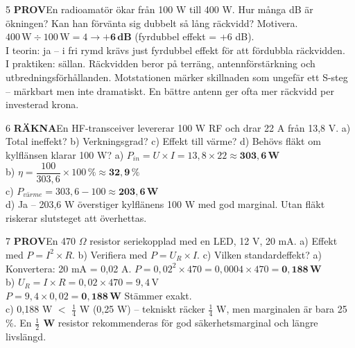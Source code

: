 \documentclass[a4paper,11pt,twoside]{book}
\newcommand{\qrakna}{\colorbox{bluepale}{\textcolor{bluedark}{\headingfont\bfseries\tiny RÄKNA}}}
\newcommand{\qprov}{\colorbox{redpale}{\textcolor{reddark}{\headingfont\bfseries\tiny PROV}}}
\begin{document}
\begin{facitblock}{5}
\qprov\quad En radioamatör ökar från 100 W till 400 W. Hur många dB är ökningen? Kan han förvänta sig dubbelt så lång räckvidd? Motivera.
\tcblower
$400\,\text{W} \div 100\,\text{W} = 4 \rightarrow \mathbf{+6\,\text{dB}}$ (fyrdubbel effekt = +6 dB).\\[4pt]
I teorin: ja – i fri rymd krävs just fyrdubbel effekt för att fördubbla räckvidden.\\
I praktiken: sällan. Räckvidden beror på terräng, antennförstärkning och utbredningsförhållanden. Motstationen märker skillnaden som ungefär ett S-steg – märkbart men inte dramatiskt. En bättre antenn ger ofta mer räckvidd per investerad krona.
\end{facitblock}

\begin{facitblock}{6}
\qrakna\quad En HF-transceiver levererar 100 W RF och drar 22 A från 13,8 V. a) Total ineffekt? b) Verkningsgrad? c) Effekt till värme? d) Behövs fläkt om kylflänsen klarar 100 W?
\tcblower
a) $P_{in} = U \times I = 13{,}8 \times 22 \approx \mathbf{303{,}6\,\text{W}}$\\
b) $\eta = \dfrac{100}{303{,}6} \times 100\,\% \approx \mathbf{32{,}9\,\%}$\\
c) $P_{värme} = 303{,}6 - 100 \approx \mathbf{203{,}6\,\text{W}}$\\
d) Ja – 203,6 W överstiger kylflänens 100 W med god marginal. Utan fläkt riskerar slutsteget att överhettas.
\end{facitblock}

\begin{facitblock}{7}
\qprov\quad En 470 $\Omega$ resistor seriekopplad med en LED, 12 V, 20 mA. a) Effekt med $P = I^2 \times R$. b) Verifiera med $P = U_R \times I$. c) Vilken standardeffekt?
\tcblower
a) Konvertera: 20 mA = 0,02 A.
$P = 0{,}02^2 \times 470 = 0{,}0004 \times 470 = \mathbf{0{,}188\,\text{W}}$\\[4pt]
b) $U_R = I \times R = 0{,}02 \times 470 = 9{,}4\,\text{V}$\\
$P = 9{,}4 \times 0{,}02 = \mathbf{0{,}188\,\text{W}}$ \checkmark Stämmer exakt.\\[4pt]
c) 0,188 W $<$ $\frac{1}{4}$ W (0,25 W) – tekniskt räcker $\frac{1}{4}$ W, men marginalen är bara 25\,\%. En \textbf{$\frac{1}{2}$ W} resistor rekommenderas för god säkerhetsmarginal och längre livslängd.
\end{facitblock}

\end{document}

